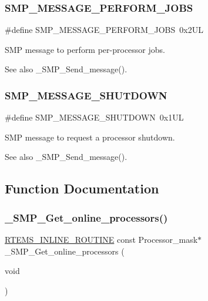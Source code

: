 \subsubsection{\texorpdfstring{SMP\_MESSAGE\_PERFORM\_JOBS}{SMP\_MESSAGE\_PERFORM\_JOBS}}
{\footnotesize\ttfamily \#define S\+M\+P\+\_\+\+M\+E\+S\+S\+A\+G\+E\+\_\+\+P\+E\+R\+F\+O\+R\+M\+\_\+\+J\+O\+BS~0x2\+UL}



S\+MP message to perform per-\/processor jobs. 

\begin{DoxySeeAlso}{See also}
\+\_\+\+S\+M\+P\+\_\+\+Send\+\_\+message(). 
\end{DoxySeeAlso}
\mbox{\label{group__RTEMSScoreSMP_gac58e85513a34442e60a845f78ae436cc}} 
\subsubsection{\texorpdfstring{SMP\_MESSAGE\_SHUTDOWN}{SMP\_MESSAGE\_SHUTDOWN}}
{\footnotesize\ttfamily \#define S\+M\+P\+\_\+\+M\+E\+S\+S\+A\+G\+E\+\_\+\+S\+H\+U\+T\+D\+O\+WN~0x1\+UL}



S\+MP message to request a processor shutdown. 

\begin{DoxySeeAlso}{See also}
\+\_\+\+S\+M\+P\+\_\+\+Send\+\_\+message(). 
\end{DoxySeeAlso}


\subsection{Function Documentation}
\mbox{\label{group__RTEMSScoreSMP_ga4646a775301c0cebd6c865245bae60a2}} 
\subsubsection{\texorpdfstring{\_SMP\_Get\_online\_processors()}{\_SMP\_Get\_online\_processors()}}
{\footnotesize\ttfamily \mbox{\hyperlink{group__RTEMSScoreBaseDefs_gac216239df231d5dbd15e3520b0b9313f}{R\+T\+E\+M\+S\+\_\+\+I\+N\+L\+I\+N\+E\+\_\+\+R\+O\+U\+T\+I\+NE}} const Processor\+\_\+mask$\ast$ \+\_\+\+S\+M\+P\+\_\+\+Get\+\_\+online\+\_\+processors (\begin{DoxyParamCaption}\item[{void}]{ }\end{DoxyParamCaption})}



